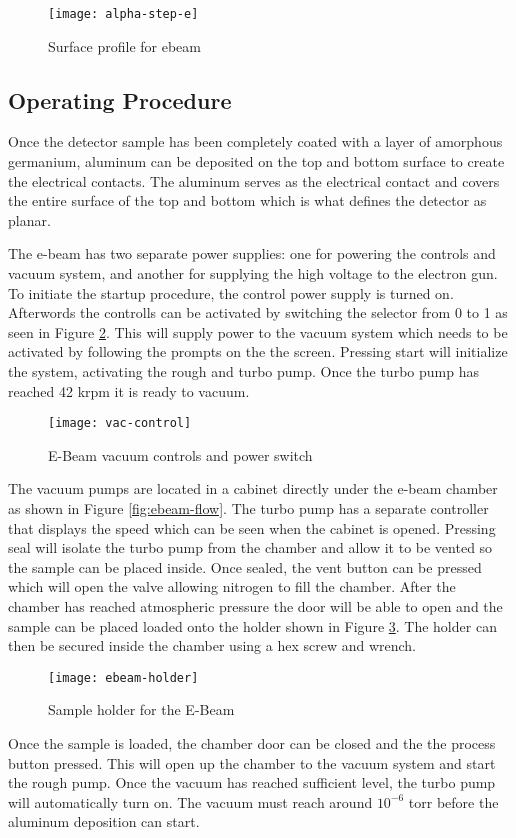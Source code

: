 \begin{figure}[htpb]
\centering
\texttt{[image: alpha-step-e]}
\caption{Surface profile for ebeam}
\label{fig:alpha-step-e}
\end{figure}

\subsection{Operating Procedure}
Once the detector sample has been completely coated with a layer of amorphous germanium, aluminum can be deposited on the top and bottom surface to create the electrical contacts.
The aluminum serves as the electrical contact and covers the entire surface of the top and bottom which is what defines the detector as planar.

The e-beam has two separate power supplies: one for powering the controls and vacuum system, and another for supplying the high voltage to the electron gun.
To initiate the startup procedure, the control power supply is turned on.
Afterwords the controlls can be activated by switching the selector from 0 to 1 as seen in Figure \ref{fig:vac-control}.
This will supply power to the vacuum system which needs to be activated by following the prompts on the the screen.
Pressing start will initialize the system, activating the rough and turbo pump.
Once the turbo pump has reached 42 krpm it is ready to vacuum.
\begin{figure}[htpb]
\centering
\texttt{[image: vac-control]}
\caption{E-Beam vacuum controls and power switch}
\label{fig:vac-control}
\end{figure}

The vacuum pumps are located in a cabinet directly under the e-beam chamber as shown in Figure \ref{fig:ebeam-flow}.
The turbo pump has a separate controller that displays the speed which can be seen when the cabinet is opened.
Pressing seal will isolate the turbo pump from the chamber and allow it to be vented so the sample can be placed inside.
Once sealed, the vent button can be pressed which will open the valve allowing nitrogen to fill the chamber.
After the chamber has reached atmospheric pressure the door will be able to open and the sample can be placed loaded onto the holder shown in Figure \ref{fig:ebeam-holder}.
The holder can then be secured inside the chamber using a hex screw and wrench.
\begin{figure}[htpb]
\centering
\texttt{[image: ebeam-holder]}
\caption{Sample holder for the E-Beam}
\label{fig:ebeam-holder}
\end{figure}
Once the sample is loaded, the chamber door can be closed and the the process button pressed.
This will open up the chamber to the vacuum system and start the rough pump.
Once the vacuum has reached sufficient level, the turbo pump will automatically turn on.
The vacuum must reach around $10^{-6}$ torr before the aluminum deposition can start.

